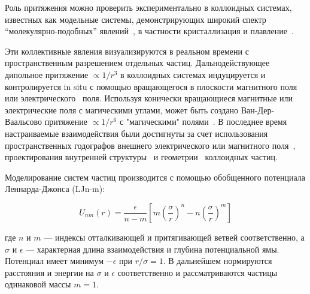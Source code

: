 Роль притяжения можно проверить экспериментально в коллоидных системах, известных как модельные системы, демонстрирующих широкий спектр ``молекулярно-подобных'' явлений~\cite{book.fernandez, book.ivlev, 10.1016/0370-1573(94)90017-5, 10.1038/natrevmats.2015.11, 10.1039/c9sm01953g}, в частности кристаллизация и плавление~\cite{10.1126/science.1112399, 10.1039/c2sm26473k, 10.1103/physrevlett.82.2721, 10.1103/physrevlett.85.3656, 10.1103/physrevlett.118.088003, 10.1039/c2sm27654b, 10.1126/science.1224763, 10.1038/s41598-021-97124-7}.

Эти коллективные явления визуализируются в реальном времени с пространственным разрешением отдельных частиц.
Дальнодействующее дипольное притяжение $\propto 1/r^3$ в коллоидных системах индуцируется и контролируется in situ с помощью вращающегося в плоскости магнитного поля~\cite{10.1088/0034-4885/76/12/126601, 10.1039/c3sm50306b, 10.1039/c3sm27620a, 10.1103/physrevmaterials.2.025602} или электрического~\cite{10.1088/1367-2630/8/11/267, 10.1063/1.3115641, 10.1021/la2014804, 10.1021/la500178b, 10.1039/c1sm06414b, 10.1038/s41598-017-14001-y} поля.
Используя конически вращающиеся магнитные или электрические поля с магическими углами, может быть создано Ван-Дер-Ваальсово притяжение $\propto 1/r^6$ с "магическими" полями~\cite{10.1021/la500896e, 10.1103/physrevlett.103.228301}.
В последнее время настраиваемые взаимодействия были достигнуты за счет использования пространственных годографов внешнего электрического или магнитного поля~\cite{10.1039/d0sm01046d}, проектирования внутренней структуры~\cite{10.1063/5.0055566} и геометрии~\cite{10.1063/5.0060705} коллоидных частиц.

Моделирование систем частиц производится с помощью обобщенного потенциала Леннарда-Джонса (LJn-m):

\begin{equation}
U_{n m}(r)=\frac{\epsilon}{n-m}\left[m\left(\frac{\sigma}{r}\right)^{n}-n\left(\frac{\sigma}{r}\right)^{m}\right]
\label{LJnm}
\end{equation}

где $n$ и $m$ — индексы отталкивающей и притягивающей ветвей соответственно, а $\sigma$ и $\epsilon$ — характерная длина взаимодействия и глубина потенциальной ямы.
Потенциал имеет минимум $-\epsilon$ при $r/\sigma=1$.
В дальнейшем нормируются расстояния и энергии на $\sigma$ и $\epsilon$ соответственно и рассматриваются частицы одинаковой массы $m=1$.

